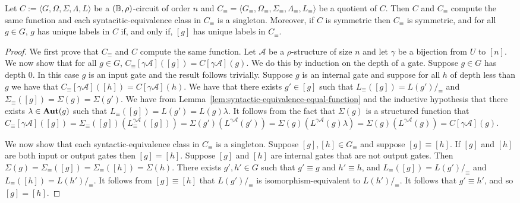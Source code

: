\documentclass[../paper.tex]{subfiles}
\begin{document}
\begin{lem}
  Let $C := \langle G, \Omega, \Sigma, \Lambda, L\rangle$ be a $(\mathbb{B},
  \rho)$-circuit of order $n$ and $C_{\equiv} = \langle G_\equiv ,
  \Omega_\equiv, \Sigma_\equiv , \Lambda_\equiv, L_\equiv \rangle$ be a quotient
  of $C$. Then $C$ and $C_{\equiv}$ compute the same function and each
  syntacitic-equivalence class in $C_\equiv$ is a singleton. Moreover, if $C$ is
  symmetric then $C_{\equiv}$ is symmetric, and for all $g \in G$, $g$ has
  unique labels in $C$ if, and only if, $[g]$ has unique labels in $C_{\equiv}$.
  \label{lem:quotient-circuits-preserve}
\end{lem}
\begin{proof}
  We first prove that $C_\equiv$ and $C$ compute the same function. Let
  $\mathcal{A}$ be a $\rho$-structure of size $n$ and let $\gamma$ be a
  bijection from $U$ to $[n]$. We now show that for all $g \in G$, $C_\equiv
  [\gamma \mathcal{A}]([g]) = C[\gamma \mathcal{A}](g)$. We do this by induction
  on the depth of a gate. Suppose $g \in G$ has depth $0$. In this case $g$ is
  an input gate and the result follows trivially. Suppose $g$ is an internal
  gate and suppose for all $h$ of depth less than $g$ we have that
  $C_\equiv[\gamma \mathcal{A}]([h]) = C[\gamma \mathcal{A}](h)$. We have that
  there exists $g' \in [g]$ such that $L_\equiv ([g]) = L(g') /_\equiv$ and
  $\Sigma_\equiv([g]) = \Sigma (g) = \Sigma (g')$. We have from
  Lemma~\ref{lem:syntactic-equivalence-equal-function} and the inductive
  hypothesis that there exists $\lambda \in \text{\textbf{Aut}}(g)$ such that $L_\equiv ([g]) =
  L(g') = L(g) \lambda$. It follows from the fact that $\Sigma(g)$ is a
  structured function that $C_\equiv[\gamma \mathcal{A}]([g]) = \Sigma_\equiv
  ([g])(L^{\gamma \mathcal{A}}_\equiv([g])) = \Sigma (g') (L^{\gamma
    \mathcal{A}}(g')) = \Sigma (g)(L^{\gamma \mathcal{A}}(g) \lambda) = \Sigma
  (g) (L^{\gamma \mathcal{A}}(g)) = C[\gamma \mathcal{A}](g)$.
  
  We now show that each syntactic-equivalence class in $C_\equiv$ is a
  singleton. Suppose $[g], [h] \in G_\equiv$ and suppose $[g] \equiv [h]$. If
  $[g]$ and $[h]$ are both input or output gates then $[g] = [h]$. Suppose $[g]$
  and $[h]$ are internal gates that are not output gates. Then $\Sigma (g) =
  \Sigma_\equiv ([g]) = \Sigma_\equiv([h]) = \Sigma(h)$. There exists $g', h'
  \in G$ such that $g' \equiv g$ and $h' \equiv h$, and $L_\equiv ([g]) = L(g')
  /_\equiv$ and $L_\equiv ([h]) = L(h') /_\equiv$. It follows from $[g] \equiv
  [h]$ that $L(g') /_\equiv$ is isomorphism-equivalent to $L(h') /_\equiv$. It
  follows that $g' \equiv h'$, and so $[g] = [h]$.


\end{proof}
\end{document}

